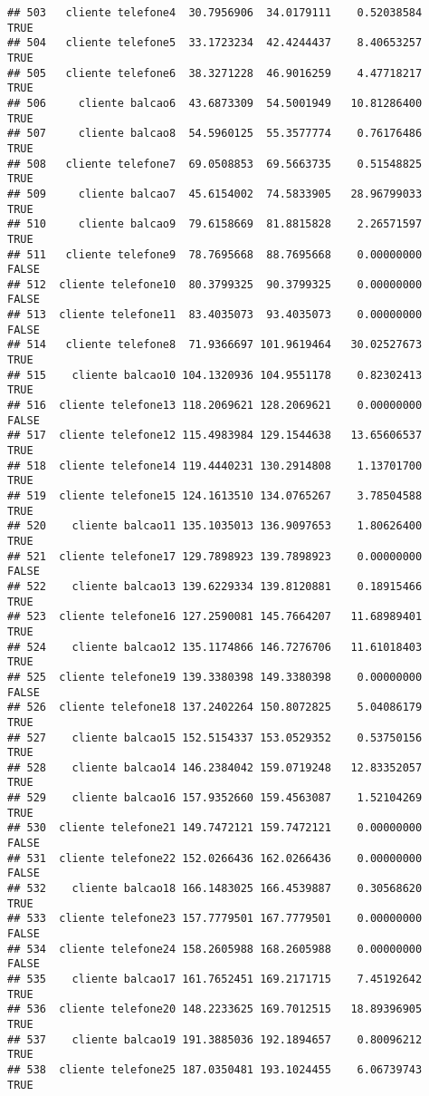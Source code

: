 \documentclass[
]{article}
\begin{document}
\begin{verbatim}
## 503   cliente telefone4  30.7956906  34.0179111    0.52038584     TRUE
## 504   cliente telefone5  33.1723234  42.4244437    8.40653257     TRUE
## 505   cliente telefone6  38.3271228  46.9016259    4.47718217     TRUE
## 506     cliente balcao6  43.6873309  54.5001949   10.81286400     TRUE
## 507     cliente balcao8  54.5960125  55.3577774    0.76176486     TRUE
## 508   cliente telefone7  69.0508853  69.5663735    0.51548825     TRUE
## 509     cliente balcao7  45.6154002  74.5833905   28.96799033     TRUE
## 510     cliente balcao9  79.6158669  81.8815828    2.26571597     TRUE
## 511   cliente telefone9  78.7695668  88.7695668    0.00000000    FALSE
## 512  cliente telefone10  80.3799325  90.3799325    0.00000000    FALSE
## 513  cliente telefone11  83.4035073  93.4035073    0.00000000    FALSE
## 514   cliente telefone8  71.9366697 101.9619464   30.02527673     TRUE
## 515    cliente balcao10 104.1320936 104.9551178    0.82302413     TRUE
## 516  cliente telefone13 118.2069621 128.2069621    0.00000000    FALSE
## 517  cliente telefone12 115.4983984 129.1544638   13.65606537     TRUE
## 518  cliente telefone14 119.4440231 130.2914808    1.13701700     TRUE
## 519  cliente telefone15 124.1613510 134.0765267    3.78504588     TRUE
## 520    cliente balcao11 135.1035013 136.9097653    1.80626400     TRUE
## 521  cliente telefone17 129.7898923 139.7898923    0.00000000    FALSE
## 522    cliente balcao13 139.6229334 139.8120881    0.18915466     TRUE
## 523  cliente telefone16 127.2590081 145.7664207   11.68989401     TRUE
## 524    cliente balcao12 135.1174866 146.7276706   11.61018403     TRUE
## 525  cliente telefone19 139.3380398 149.3380398    0.00000000    FALSE
## 526  cliente telefone18 137.2402264 150.8072825    5.04086179     TRUE
## 527    cliente balcao15 152.5154337 153.0529352    0.53750156     TRUE
## 528    cliente balcao14 146.2384042 159.0719248   12.83352057     TRUE
## 529    cliente balcao16 157.9352660 159.4563087    1.52104269     TRUE
## 530  cliente telefone21 149.7472121 159.7472121    0.00000000    FALSE
## 531  cliente telefone22 152.0266436 162.0266436    0.00000000    FALSE
## 532    cliente balcao18 166.1483025 166.4539887    0.30568620     TRUE
## 533  cliente telefone23 157.7779501 167.7779501    0.00000000    FALSE
## 534  cliente telefone24 158.2605988 168.2605988    0.00000000    FALSE
## 535    cliente balcao17 161.7652451 169.2171715    7.45192642     TRUE
## 536  cliente telefone20 148.2233625 169.7012515   18.89396905     TRUE
## 537    cliente balcao19 191.3885036 192.1894657    0.80096212     TRUE
## 538  cliente telefone25 187.0350481 193.1024455    6.06739743     TRUE

\end{verbatim}
\end{document}

